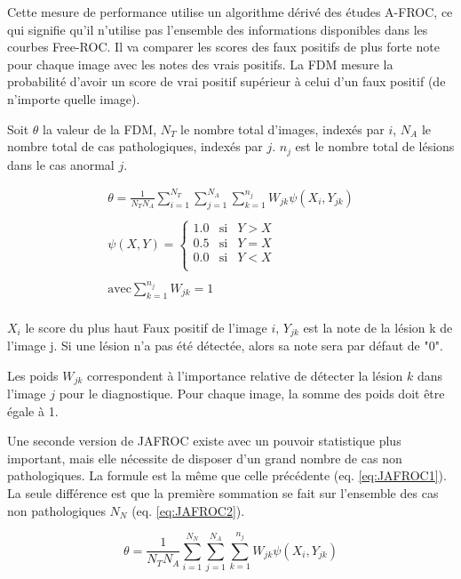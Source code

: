 Cette mesure de performance utilise un algorithme dérivé des études A-FROC, ce qui signifie qu'il n'utilise pas l'ensemble des informations disponibles dans les courbes Free-ROC. Il va comparer les scores des faux positifs de plus forte note pour chaque image avec les notes des vrais positifs. La FDM mesure la probabilité d'avoir un score de vrai positif supérieur à celui d'un faux positif (de n'importe quelle image).

Soit $\theta$ la valeur de la FDM, $N_T$ le nombre total d'images, indexés par $i$, $N_A$ le nombre total de cas pathologiques, indexés par $j$. $n_j$ est le nombre total de lésions dans le cas anormal $j$.

\begin{equation}
\label{eq:JAFROC1}
\begin{array}{l}
	\displaystyle \theta=\frac{1}{N_T N_A} \sum_{i=1}^{N_T} \sum_{j=1}^{N_A} \sum_{k=1}^{n_j} W_{jk} \psi(X_i, Y_{jk}) \\
	\\
	\displaystyle \psi(X,Y) = \left\{
		\begin{array}{lll}
			1.0 & \mbox{si} & Y > X \\
			0.5 & \mbox{si} & Y = X    \\
			0.0 & \mbox{si} & Y < X    \\
		\end{array}
	\right. \\
	\\
	\displaystyle \mbox{avec} \sum_{k=1}^{n_j} W_{jk} = 1 \\
\end{array}
\end{equation}

$X_i$ le score du plus haut Faux positif de l'image $i$, $Y_{jk}$ est la note de la lésion k de l'image j. Si une lésion n'a pas été détectée, alors sa note sera par défaut de "0".

Les poids $W_{jk}$ correspondent à l'importance relative de détecter la lésion $k$ dans l'image $j$ pour le diagnostique. Pour chaque image, la somme des poids doit être égale à 1.

Une seconde version de JAFROC existe avec un pouvoir statistique plus important, mais elle nécessite de disposer d'un grand nombre de cas non pathologiques. La formule est la même que celle précédente (eq. \ref{eq:JAFROC1}). La seule différence est que la première sommation se fait sur l'ensemble des cas non pathologiques $N_N$ (eq. \ref{eq:JAFROC2}).

\begin{equation}
\label{eq:JAFROC2}
\theta=\frac{1}{N_T N_A} \sum_{i=1}^{N_N} \sum_{j=1}^{N_A} \sum_{k=1}^{n_j} W_{jk} \psi(X_i, Y_{jk})
\end{equation}



